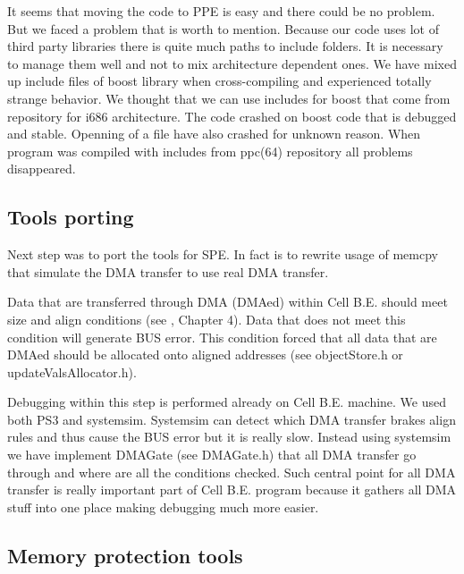 \par
It seems that moving the code to PPE is easy and there could be no problem.
But we faced a problem that is worth to mention.
Because our code uses lot of third party libraries there is quite much paths to include folders.
It is necessary to manage them well and not to mix architecture dependent ones.
We have mixed up include files of boost library when cross-compiling and experienced totally strange behavior.
We thought that we can use includes for boost that come from repository for i686 architecture.
The code crashed on boost code that is debugged and stable.
Openning of a file have also crashed for unknown reason.
When program was compiled with includes from ppc(64) repository all problems disappeared.

\subsection{Tools porting}

\par
Next step was to port the tools for SPE.
In fact is to rewrite usage of memcpy that simulate the DMA transfer to use real DMA transfer.

\par
Data that are transferred through DMA (DMAed) within Cell B.E. should meet size and align conditions (see \cite{programmersGuide}, Chapter 4).
Data that does not meet this condition will generate BUS error.
This condition forced that all data that are DMAed should be allocated onto aligned addresses (see objectStore.h or updateValsAllocator.h).

\par
Debugging within this step is performed already on Cell B.E. machine.
We used both PS3 and systemsim.
Systemsim can detect which DMA transfer brakes align rules and thus cause the BUS error but it is really slow.
Instead using systemsim we have implement DMAGate (see DMAGate.h) that all DMA transfer go through and where are all the conditions checked.
Such central point for all DMA transfer is really important part of Cell B.E. program because it gathers all DMA stuff into one place making debugging much more easier.

\subsection{Memory protection tools}

